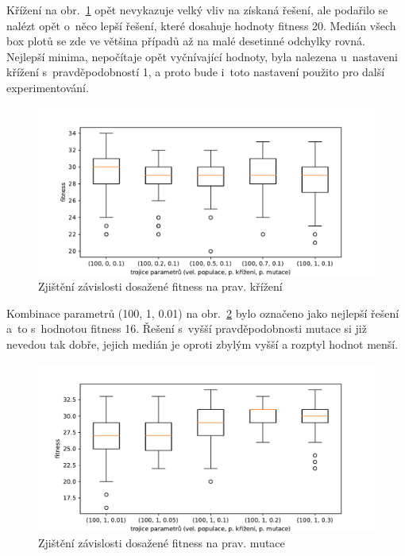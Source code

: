 Křížení na obr.~\ref{fig:exp-lgp-random-searching-params-2} opět nevykazuje velký vliv na získaná řešení, ale podařilo se nalézt opět o~něco lepší řešení, které dosahuje hodnoty fitness 20. Medián všech box plotů se zde ve většina případů až na malé desetinné odchylky rovná. Nejlepší minima, nepočítaje opět vyčnívající hodnoty, byla nalezena u~nastaveni křížení s~pravděpodobností 1, a proto bude i~toto nastavení použito pro další experimentování.

\begin{figure}[!h]
    \centering
    \includegraphics[scale=0.75]{obrazky-figures/exp-lgp-random-searching-params-2.pdf}
    \caption{Zjištění závislosti dosažené fitness na prav. křížení}
    \label{fig:exp-lgp-random-searching-params-2}
\end{figure}

Kombinace parametrů (100, 1, 0.01) na obr.~\ref{fig:exp-lgp-random-searching-params-3} bylo označeno jako nejlepší řešení a~to s~hodnotou fitness 16. Řešení s~vyšší pravděpodobnosti mutace si již nevedou tak dobře, jejich medián je oproti zbylým vyšší a rozptyl hodnot menší. 

\begin{figure}[!h]
    \centering
    \includegraphics[scale=0.75]{obrazky-figures/exp-lgp-random-searching-params-3.pdf}
    \caption{Zjištění závislosti dosažené fitness na prav. mutace}
    \label{fig:exp-lgp-random-searching-params-3}
\end{figure}

